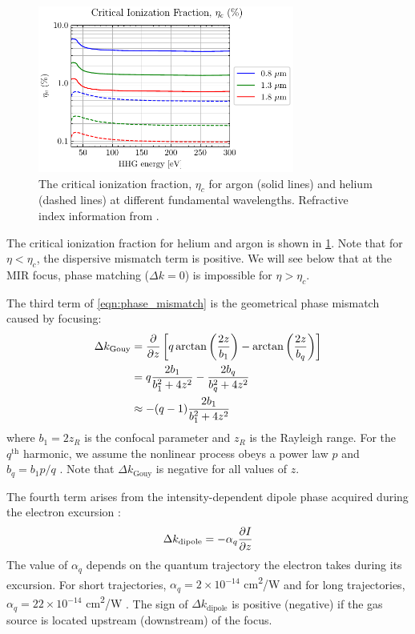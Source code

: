 \begin{figure}
	\centering
	\includegraphics[width=0.75\textwidth]{figures/chap1/crit_ion_frac.pdf}
	\caption{The critical ionization fraction, $\eta_c$ for argon (solid lines) and helium (dashed lines) at different fundamental wavelengths. Refractive index information from \cite{gulliksonCXROXRayInteractions,peckDispersionArgon1964,mansfieldDispersionHelium1969}.}
	\label{fig:crit_ion_frac}
\end{figure}

The critical ionization fraction for helium and argon is shown in \cref{fig:crit_ion_frac}. Note that for $\eta < \eta_c$, the dispersive mismatch term is positive. We will see below that at the MIR focus, phase matching ($\Delta k = 0$) is impossible for $\eta > \eta_c$.

The third term of \cref{eqn:phase_mismatch} is the geometrical phase mismatch caused by focusing:
\begin{align}
\Delta k_{\textrm{Gouy}} &= \pdv{z} \left[ q \arctan\left( \frac{2 z}{b_1} \right) - \arctan \left( \frac{2 z}{b_q} \right) \right] \nonumber \\
&= q \frac{2 b_1}{b_1^2 + 4 z^2} - \frac{2 b_q}{b_q^2 + 4 z^2} \nonumber \\
&\approx -(q-1) \frac{2 b_1}{b_1^2 + 4 z^2}
\end{align}
where $b_1 = 2 z_R$ is the confocal parameter and $z_R$ is the Rayleigh range. For the $q^{\textrm{th}}$ harmonic, we assume the nonlinear process obeys a power law $p$ and $b_q = b_1 p /q$ \cite{schounAttosecondHighHarmonicSpectroscopy2015}. Note that $\Delta k_{\textrm{Gouy}}$ is negative for all values of $z$.

The fourth term arises from the intensity-dependent dipole phase acquired during the electron excursion \cite{lewensteinTheoryHighharmonicGeneration1994,balcouGeneralizedPhasematchingConditions1997,salieresCoherenceControlHighOrder1995}:
\begin{equation}
\Delta k_{\textrm{dipole}} = - \alpha_q \pdv{I}{z}
\label{eqn:deltak_atomic}
\end{equation}
The value of $\alpha_q$ depends on the quantum trajectory the electron takes during its excursion. For short trajectories, {$\alpha_q = 2 \times 10^{-14}$ cm\textsuperscript{2}/W} and for long trajectories, {$\alpha_q = 22 \times 10^{-14}$ cm\textsuperscript{2}/W} \cite{kazamiasPressureinducedPhaseMatching2011,balcouQuantumpathAnalysisPhase1999}. The sign of $\Delta k_{\textrm{dipole}}$ is positive (negative) if the gas source is located upstream (downstream) of the focus.

